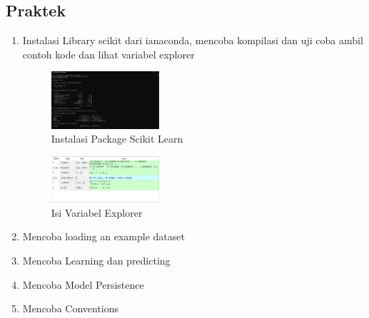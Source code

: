 \subsection{Praktek}
\begin{enumerate}
	\item Instalasi Library scikit dari ianaconda, mencoba kompilasi dan uji coba ambil contoh kode dan lihat variabel explorer
	\hfill\break
	\begin{figure}[H]
		\includegraphics[width=4cm]{figures/1174077/1/instalasi.PNG}
		\centering
		\caption{Instalasi Package Scikit Learn}
	\end{figure}
	\begin{figure}[H]
		\includegraphics[width=4cm]{figures/1174077/1/variabel.PNG}
		\centering
		\caption{Isi Variabel Explorer}
	\end{figure}
	\item Mencoba loading an example dataset
	\hfill\break
	
	\item Mencoba Learning dan predicting
	\hfill\break
	
	\item Mencoba Model Persistence
	\hfill\break
	
	\item Mencoba Conventions
	\hfill\break
	
\end{enumerate}
